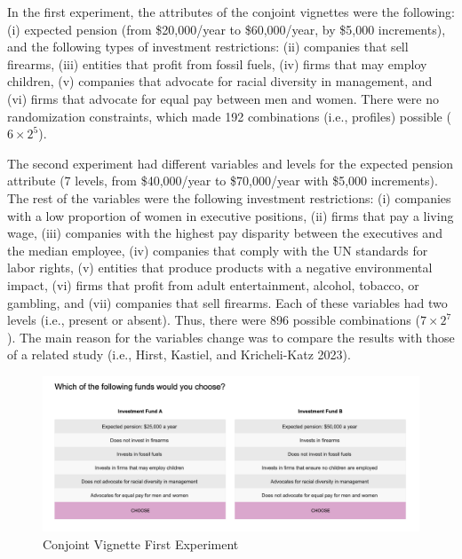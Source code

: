 \documentclass[
  12pt,
]{article}
\begin{document}
In the first experiment, the attributes of the conjoint vignettes were the following: (i) expected pension (from \$20,000/year to \$60,000/year, by \$5,000 increments), and the following types of investment restrictions: (ii) companies that sell firearms, (iii) entities that profit from fossil fuels, (iv) firms that may employ children, (v) companies that advocate for racial diversity in management, and (vi) firms that advocate for equal pay between men and women. There were no randomization constraints, which made 192 combinations (i.e., profiles) possible (\(6 \times 2^5\)).

The second experiment had different variables and levels for the expected pension attribute (7 levels, from \$40,000/year to \$70,000/year with \$5,000 increments). The rest of the variables were the following investment restrictions: (i) companies with a low proportion of women in executive positions, (ii) firms that pay a living wage, (iii) companies with the highest pay disparity between the executives and the median employee, (iv) companies that comply with the UN standards for labor rights, (v) entities that produce products with a negative environmental impact, (vi) firms that profit from adult entertainment, alcohol, tobacco, or gambling, and (vii) companies that sell firearms. Each of these variables had two levels (i.e., present or absent). Thus, there were 896 possible combinations (\(7 \times 2^7\)). The main reason for the variables change was to compare the results with those of a related study (i.e., Hirst, Kastiel, and Kricheli-Katz 2023).

\begin{figure}

{\centering \includegraphics{cj1} 

}

\caption{Conjoint Vignette First Experiment}\label{fig:cj1}
\end{figure}
\end{document}
